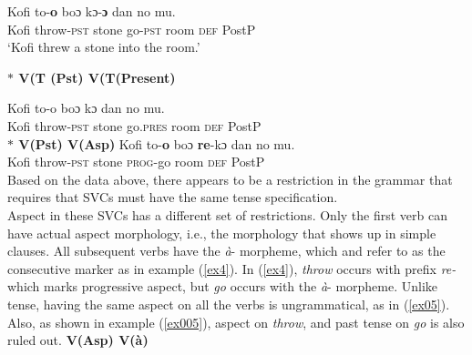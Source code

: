 \documentclass[output=paper,colorlinks,citecolor=brown]{langscibook}
\begin{document}
\ea\label{ex01} 
\gll Kofi to-\textbf{o} boɔ kɔ-\textbf{ɔ} dan no mu. \\
    Kofi throw-\textsc{pst} stone go-\textsc{pst} room \textsc{def} PostP   \\
\glt `Kofi threw a stone into the room.'

\z 
\ex\label{ex2}
\textbf{$\ast$ \phantom {} {} {}  V(T (Pst)\phantom {} {} {}   V(T(Present)} 
     \ea\label{ex001} 

\gll * Kofi to-o boɔ  kɔ dan no mu.\\
	{} Kofi throw-\textsc{pst} stone  go.\textsc{pres} room \textsc{def} PostP\\
\z 
\ex\label{ex3}
\textbf{$\ast$ \phantom {} {} {}  V(Pst)\phantom {} {} {}   V(Asp)} 
     \ea\label{ex0001} 
\gll * Kofi to-\textbf{o} boɔ  \textbf{re}-kɔ dan no mu.\\
	{} Kofi throw-\textsc{pst} stone  \textsc{prog}-go room  \textsc{def} PostP\\	
\z 
\z \z 
Based on the data above, there appears to be a restriction in the grammar that requires that SVCs must have the same tense specification.   \\ 
Aspect in these SVCs has a different set of restrictions. Only the first verb can have actual aspect morphology, i.e., the morphology that shows up in simple clauses. All subsequent verbs have the \emph{\`a}- morpheme, which \citet{Dolphyne1996} and \citet{Osam2003} refer to as the consecutive marker as in example (\ref{ex4}). In (\ref{ex4}), \emph{throw} occurs with prefix \emph{re-} which marks progressive aspect, but \emph{go} occurs with the \emph{\`a}- morpheme. Unlike tense, having the same aspect on all the verbs is ungrammatical, as in (\ref{ex05}). Also, as shown in example (\ref{ex005}), aspect on \emph{throw}, and past tense on \emph{go} is also ruled out. 
\ea \label{ex04}
\ea \textbf{V(Asp) \phantom {} {} {} V(\`a)}
\end{document}
